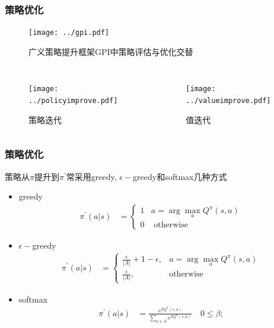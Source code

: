 \documentclass{beamer}
\begin{document}
\begin{CJK*}{GBK}{hei}
\begin{frame}\frametitle{策略优化}
    \begin{figure}[htbp]
       \centering\texttt{[image: ../gpi.pdf]}
	   \caption{广义策略提升框架GPI中策略评估与优化交替\citep{sutton2018reinforcement}}
    \end{figure}
    \begin{columns}
            \begin{figure}[htbp]
       \centering\texttt{[image: ../policyimprove.pdf]}
	   \caption{策略迭代}
    \end{figure}
                    \begin{figure}[htbp]
       \centering\texttt{[image: ../valueimprove.pdf]}
	   \caption{值迭代}
    \end{figure}
    \end{columns}
\end{frame}

\begin{frame}\frametitle{策略优化}
策略从$\pi$提升到$\pi^{\prime}$常采用greedy, $\epsilon-$greedy和softmax几种方式
\begin{itemize}
    \item greedy
    \begin{align*}
    \pi^{\prime}(a | s)&=\left\{
        \begin{array}{ll}
            1 &  a=\arg \max _{a} Q^{\pi}(s, a) \\
            0 & \text { otherwise }
        \end{array}\right.
    \end{align*}
    \item $\epsilon-$greedy
    \begin{align*}
        \pi^{\prime}(a | s)&=\left\{\begin{array}{ll}
        \frac{\epsilon}{|A|}+1-\epsilon, & a=\arg \max _{a} Q^{\pi}(s, a) \\
        \frac{\epsilon}{|A|}, & \text {otherwise}
        \end{array}\right.
    \end{align*}
    \item softmax
    \begin{align*}
        \pi^{\prime}(a | s)&=\frac{e^{\beta {Q^{\pi}(s,a)}}}{\sum_{a\in A} e^{{\beta Q^{\pi}(s,a)}}}\quad 0 \leq \beta;
    \end{align*}
\end{itemize}
\end{frame}


\end{CJK*}
\end{document}
